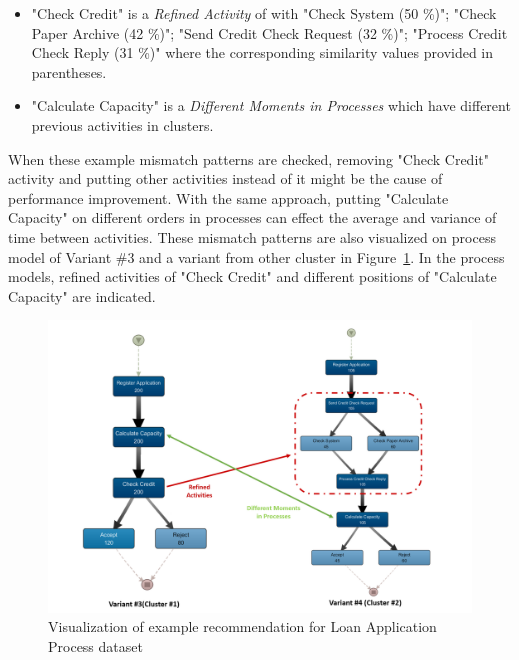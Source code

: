 \begin{itemize}
		\begin{itemize}
		\item "Check Credit" is a \textit{Refined Activity} of with "Check System (50 \%)"; "Check Paper Archive (42 \%)"; "Send Credit Check Request (32 \%)"; "Process Credit Check Reply (31 \%)" where the corresponding similarity values provided in parentheses.
		\item "Calculate Capacity" is a \textit{Different Moments in Processes} which have different previous activities in clusters. 
		\end{itemize}
	When these example mismatch patterns are checked, removing "Check Credit" activity and putting other activities instead of it might be the cause of performance improvement. With the same approach, putting "Calculate Capacity" on different orders in processes can effect the average and variance of time between activities. These mismatch patterns are also visualized on process model of Variant \#3 and a variant from other cluster in Figure~\ref{fig:loan-recommendation-visualization}. In the process models, refined activities of "Check Credit" and different positions of "Calculate Capacity" are indicated. 
		\begin{figure}
			\centering
			\includegraphics[width=\textwidth]{5_results_discussions/loan-application-process/recommendation-visualization}
			\caption{Visualization of example recommendation for Loan Application Process dataset}
		  \label{fig:loan-recommendation-visualization}
		\end{figure}
\end{itemize} %